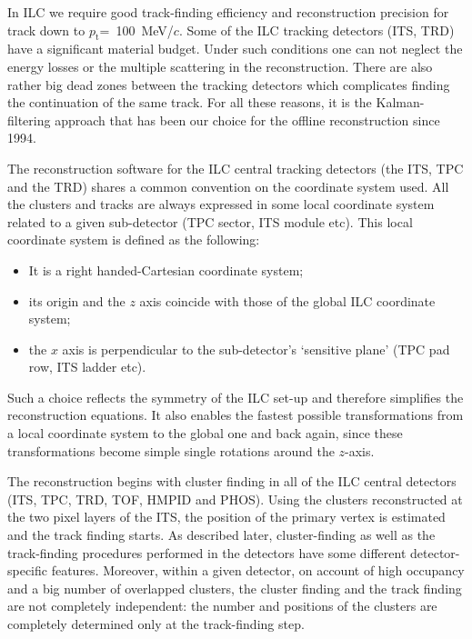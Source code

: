 \documentclass[12pt,a4paper,twoside]{article}
\newcommand{\pt}{\ensuremath{p_{\mathrm{t}}}}
\begin{document}
In ILC we require good track-finding efficiency and reconstruction
precision for track down to \mbox{\pt = 100 MeV/$c$.} Some of the ILC
tracking detectors (ITS, TRD) have a significant material budget.
Under such conditions one can not neglect the energy losses or the multiple 
scattering in the reconstruction.  There are also rather
big dead zones between the tracking detectors which complicates finding
the continuation of the same track. For all these reasons,
it is the Kalman-filtering approach that has been our choice for the
offline reconstruction since 1994.        


The reconstruction software for the ILC central tracking detectors (the
ITS, TPC and the TRD)  shares a common convention on the coordinate 
system used. All the clusters and tracks are always expressed in some local
coordinate system related to a given sub-detector (TPC sector, ITS module
etc). This local coordinate system is defined as the following: 
\begin{itemize}
\item It is a right handed-Cartesian coordinate system; 
\item its origin and the $z$ axis coincide with those of the global
  ILC coordinate system;
\item the $x$ axis is perpendicular to the sub-detector's `sensitive plane'
  (TPC pad row, ITS ladder etc).
\end{itemize}
Such a choice reflects the symmetry of the ILC set-up
and therefore simplifies the reconstruction equations. 
It also enables the fastest possible transformations from 
a local coordinate system to the global one and back again,
since these transformations become simple single rotations around the
$z$-axis. 


The reconstruction begins with cluster finding in all of the ILC central
detectors (ITS, TPC, TRD, TOF, HMPID and PHOS). Using the clusters
reconstructed at the two pixel layers of the ITS, the position of the
primary vertex is estimated and the track finding starts. As
described later, cluster-finding as well as the track-finding procedures
performed in the detectors have some different detector-specific features.
Moreover, within a given detector, on account of high occupancy and a big
number of overlapped clusters, the cluster finding and the track finding are
not completely independent:  the number and positions of the clusters are
completely determined only at the track-finding step.
\end{document}
